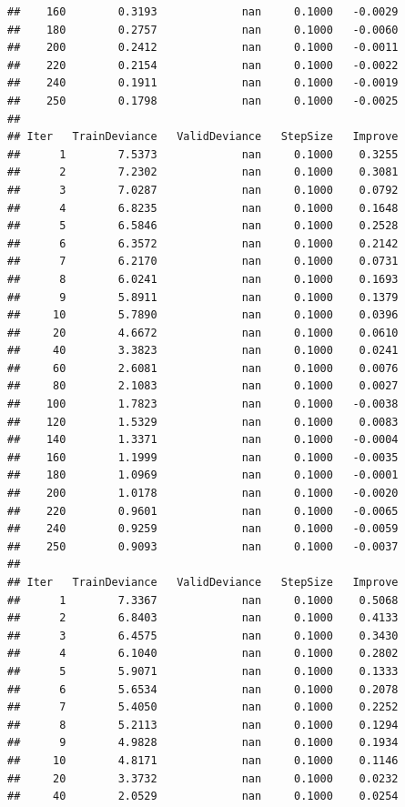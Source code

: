 \documentclass[
]{book}
\begin{document}
\begin{verbatim}
##    160        0.3193             nan     0.1000   -0.0029
##    180        0.2757             nan     0.1000   -0.0060
##    200        0.2412             nan     0.1000   -0.0011
##    220        0.2154             nan     0.1000   -0.0022
##    240        0.1911             nan     0.1000   -0.0019
##    250        0.1798             nan     0.1000   -0.0025
## 
## Iter   TrainDeviance   ValidDeviance   StepSize   Improve
##      1        7.5373             nan     0.1000    0.3255
##      2        7.2302             nan     0.1000    0.3081
##      3        7.0287             nan     0.1000    0.0792
##      4        6.8235             nan     0.1000    0.1648
##      5        6.5846             nan     0.1000    0.2528
##      6        6.3572             nan     0.1000    0.2142
##      7        6.2170             nan     0.1000    0.0731
##      8        6.0241             nan     0.1000    0.1693
##      9        5.8911             nan     0.1000    0.1379
##     10        5.7890             nan     0.1000    0.0396
##     20        4.6672             nan     0.1000    0.0610
##     40        3.3823             nan     0.1000    0.0241
##     60        2.6081             nan     0.1000    0.0076
##     80        2.1083             nan     0.1000    0.0027
##    100        1.7823             nan     0.1000   -0.0038
##    120        1.5329             nan     0.1000    0.0083
##    140        1.3371             nan     0.1000   -0.0004
##    160        1.1999             nan     0.1000   -0.0035
##    180        1.0969             nan     0.1000   -0.0001
##    200        1.0178             nan     0.1000   -0.0020
##    220        0.9601             nan     0.1000   -0.0065
##    240        0.9259             nan     0.1000   -0.0059
##    250        0.9093             nan     0.1000   -0.0037
## 
## Iter   TrainDeviance   ValidDeviance   StepSize   Improve
##      1        7.3367             nan     0.1000    0.5068
##      2        6.8403             nan     0.1000    0.4133
##      3        6.4575             nan     0.1000    0.3430
##      4        6.1040             nan     0.1000    0.2802
##      5        5.9071             nan     0.1000    0.1333
##      6        5.6534             nan     0.1000    0.2078
##      7        5.4050             nan     0.1000    0.2252
##      8        5.2113             nan     0.1000    0.1294
##      9        4.9828             nan     0.1000    0.1934
##     10        4.8171             nan     0.1000    0.1146
##     20        3.3732             nan     0.1000    0.0232
##     40        2.0529             nan     0.1000    0.0254

\end{verbatim}
\end{document}
